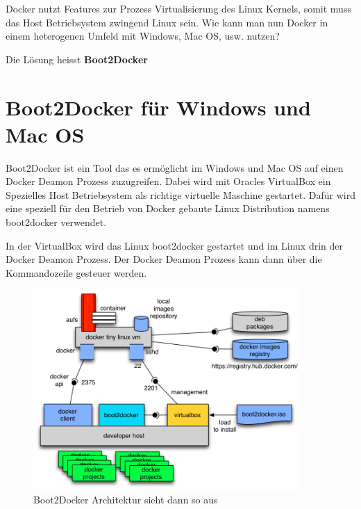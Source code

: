 Docker nutzt Features zur Prozess Virtualisierung des Linux Kernels, somit muss das Host
Betriebsystem zwingend Linux sein. Wie kann man nun Docker in einem heterogenen Umfeld mit
Windows, Mac OS, usw. nutzen?

Die Lösung heisst \textbf{Boot2Docker}

\section{Boot2Docker für Windows und Mac OS}

Boot2Docker ist ein Tool das es ermöglicht im Windows und Mac OS auf einen Docker Deamon
Prozess zuzugreifen. Dabei wird mit Oracles VirtualBox ein Spezielles Host Betriebsystem
als richtige virtuelle Maschine gestartet. Dafür wird eine speziell für den Betrieb von
Docker gebaute Linux Distribution namens boot2docker verwendet.

In der VirtualBox wird das Linux boot2docker gestartet und im Linux drin der Docker Deamon
Prozess. Der Docker Deamon Prozess kann dann über die Kommandozeile gesteuer werden.
\\

\begin{figure}[htbp]
  \begin{center}
    \includegraphics[width=0.9\textwidth]{./images/boot2docker.png}
    \caption{Boot2Docker Architektur sieht dann so aus}
    \label{img:boot2docker}
  \end{center}
\end{figure}
